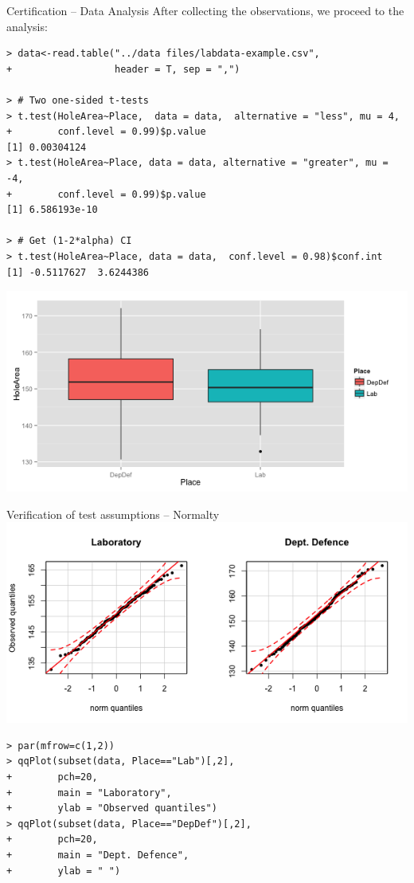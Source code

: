 \begin{frame}[fragile]{Certification -- Data Analysis}
After collecting the observations, we proceed to the analysis:
{\tiny
\begin{verbatim}
> data<-read.table("../data files/labdata-example.csv",
+                  header = T, sep = ",")

> # Two one-sided t-tests
> t.test(HoleArea~Place,  data = data,  alternative = "less", mu = 4,
+        conf.level = 0.99)$p.value
[1] 0.00304124
> t.test(HoleArea~Place, data = data, alternative = "greater", mu = -4,
+        conf.level = 0.99)$p.value
[1] 6.586193e-10

> # Get (1-2*alpha) CI
> t.test(HoleArea~Place, data = data,  conf.level = 0.98)$conf.int
[1] -0.5117627  3.6244386
\end{verbatim}}

\hfill\includegraphics[width=.45\textwidth]{../img/labdata.png}
\end{frame}


\begin{frame}[fragile]{Verification of test assumptions -- Normalty}
\hfill\includegraphics[width=.6\textwidth]{../img/labdata-qqplots.png}
{\smaller
\begin{verbatim}
> par(mfrow=c(1,2))
> qqPlot(subset(data, Place=="Lab")[,2],
+        pch=20,
+        main = "Laboratory",
+        ylab = "Observed quantiles")
> qqPlot(subset(data, Place=="DepDef")[,2],
+        pch=20,
+        main = "Dept. Defence",
+        ylab = " ")
\end{verbatim}}
\end{frame}

